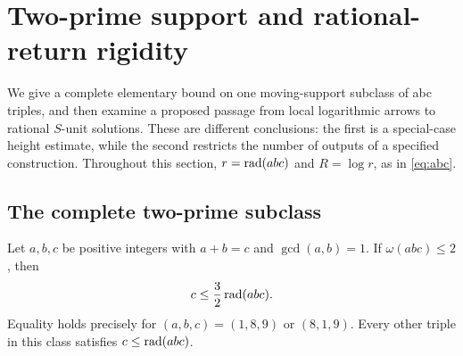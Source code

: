 \section{Two-prime support and rational-return rigidity}
\label{sec:uniform-analytic-continuation}

We give a complete elementary bound on one moving-support subclass of
abc triples, and then examine a proposed passage from local logarithmic
arrows to rational $S$-unit solutions. These are different conclusions:
the first is a special-case height estimate, while the second restricts
the number of outputs of a specified construction. Throughout this
section, $r=\operatorname{rad}(abc)$ and $R=\log r$, as in \eqref{eq:abc}.

\subsection{The complete two-prime subclass}

\begin{theorem}
\label{thm:uac-two-prime}
Let $a,b,c$ be positive integers with $a+b=c$ and $\gcd(a,b)=1$.
If $\omega(abc)\le2$, then
\begin{equation}\label{eq:uac-two-prime-bound}
                         c\le\frac32\operatorname{rad}(abc).
\end{equation}
Equality holds precisely for $(a,b,c)=(1,8,9)$ or $(8,1,9)$.
Every other triple in this class satisfies $c\le\operatorname{rad}(abc)$.
\end{theorem}

